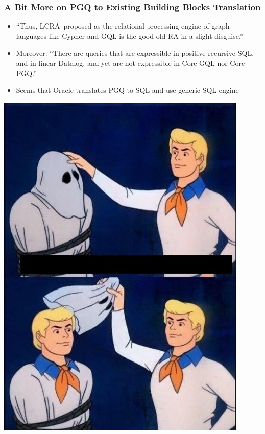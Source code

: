 \documentclass[xcolor=table,aspectratio=169]{beamer}
\begin{document}
\begin{frame}[fragile]
  \frametitle{A Bit More on PGQ to Existing Building Blocks Translation}
  \begin{minipage}[t]{0.72\textwidth}
    \begin{itemize}
      \item ``Thus, LCRA\footnotemark \ proposed as the relational processing engine of graph languages like Cypher and GQL is the good old RA in a slight disguise.''\footnotemark
      \item Moreover: ``There are queries that are expressible in positive recursive SQL, and in linear Datalog, and yet are not expressible in Core GQL nor Core PGQ.''\footnotemark
      \pause
      \item Seems that Oracle translates PGQ to SQL and use generic SQL engine\footnotemark
    \end{itemize}
\end{minipage}
\begin{minipage}[t]{0.27\textwidth}
  \pause
  \begin{center}
  \includegraphics[valign=t,width=0.9\textwidth]{pictures/meme-template.jpeg}
  \end{center}
\end{minipage}
\end{frame}
\end{document}

